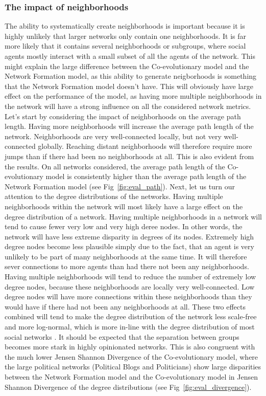 \documentclass{article}
\begin{document}
\subsubsection{The impact of neighborhoods}
The ability to systematically create neighborhoods is important because it is highly unlikely that larger networks only contain one neighborhoods. It is far more likely that it contains several neighborhoods or subgroups, where social agents mostly interact with a small subset of all the agents of the network. 
This might explain the large difference between the Co-evolutionary model and the Network Formation model, as this ability to generate neigborhoods is something that the Network Formation model doesn't have. This will obviously have large effect on the performance of the model, as having more multiple neighborhoods in the network will have a strong influence on all the considered network metrics. 
Let's start by considering the impact of neighborhoods on the average path length. Having more neighborhoods will increase the average path length of the network. Neighborhoods are very well-connected locally, but not very well-connected globally. Reaching distant neighborhoods will therefore require more jumps than if there had been no neighborhoods at all. This is also evident from the results. On all networks considered, the average path length of the Co-evolutionary model is consistently higher than the average path length of the Network Formation model (see Fig~\ref{fig:eval_path}).
Next, let us turn our attention to the degree distributions of the networks. Having multiple neighborhoods within the network will most likely have a large effect on the degree distribution of a network. Having multiple neighborhoods in a network will tend to cause fewer very low and very high deree nodes. In other words, the network will have less extreme disparity in degrees of its nodes. Extremely high degree nodes become less plausible simply due to the fact, that an agent is very unlikely to be part of many neighborhoods at the same time. It will therefore sever connections to more agents than had there not been any neighborhoods. Having multiple neighborhoods will tend to reduce the number of extremely low degree nodes, because these neighborhoods are locally very well-connected. Low degree nodes will have more connections within these neighborhoods than they would have if there had not been any neighborhoods at all. 
These two effects combined will tend to make the degree distribution of the network less scale-free and more log-normal, which is more in-line with the degree distribution of most social networks \cite{broido_scale-free_2019}. It should be expected that the separation between groups becomes more stark in highly opinionated networks. This is also congruent with the much lower Jensen Shannon Divergence of the Co-evolutionary model, where the large political networks (Political Blogs and Politicians) show large disparities between the Network Formation model and the Co-evolutionary model in Jensen Shannon Divergence of the degree distributions (see Fig~\ref{fig:eval_divergence}).
\end{document}
